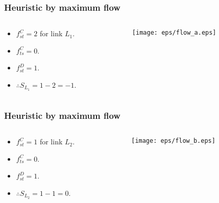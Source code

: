 \documentclass[xcolor=dvipsnames,envcountsect,handout]{beamer}
\begin{document}
\begin{frame}
\frametitle{Heuristic by maximum flow}
\vspace{-6pt}
\begin{columns}
\begin{column}[t]{6cm}
\begin{itemize}
\item $f_{st}^C = 2$ for link $L_1$. 
\vspace{6pt}
\item $f_{ts}^C = 0$.
\vspace{6pt}
\item $f_{st}^D = 1$. 
\vspace{6pt}
\item $\therefore S_{L_1} = 1 - 2 = -1$.  
\end{itemize}
\end{column}
\begin{column}[t]{6cm}
\vspace{-8pt}
\begin{figure}[H]
\centering
\texttt{[image: eps/flow\_a.eps]}
\end{figure}
\end{column}
\end{columns}
\end{frame}


\begin{frame}
\frametitle{Heuristic by maximum flow} 
\vspace{-6pt}
\begin{columns}
\begin{column}[t]{6cm}
\begin{itemize}
\item $f_{st}^C = 1$ for link $L_2$.
\vspace{6pt}
\item $f_{ts}^C = 0$.
\vspace{6pt}
\item $f_{st}^D = 1$.
\vspace{6pt}
\item $\therefore S_{L_2} = 1 - 1 = 0$.
\end{itemize}
\end{column}
\begin{column}[t]{6cm}
\vspace{-8pt}
\begin{figure}[H]
\centering
\hspace{-4pt}
\texttt{[image: eps/flow\_b.eps]}
\end{figure}
\end{column}
\end{columns}
\end{frame}
\end{document}
